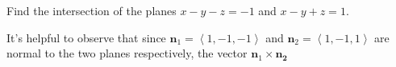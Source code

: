 \documentclass[answers,12pt,addpoints]{exam}
\begin{document}
\begin{questions}
\question[25] Find the intersection of the planes
$x-y-z=-1$ and $x-y+z=1$.
\begin{solution}[1in]
It's helpful to observe that since
$\mathbold{n}_1=\left\langle 1,-1,-1\right\rangle$ and
$\mathbold{n}_2=\left\langle 1,-1,1\right\rangle$
are normal to the two planes respectively,
the vector $\mathbold{n}_1\times\mathbold{n_2}$

\end{solution}

\end{questions}
\end{document}
